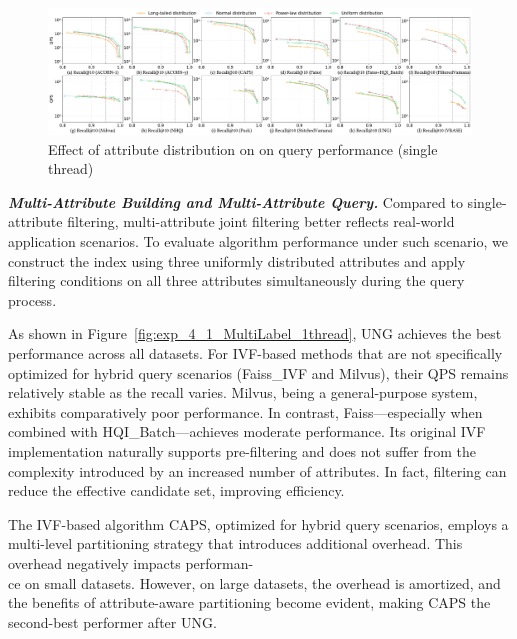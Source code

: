 \documentclass[sigconf, nonacm]{acmart}
\begin{document}
\begin{sloppypar}
\begin{figure}
        \centering
        \setlength{\abovecaptionskip}{0cm}
        \setlength{\belowcaptionskip}{-0.4cm}
        \includegraphics[width=\textwidth]{figures/exp/exp_3_1.pdf}
        \caption{Effect of attribute distribution on on query performance (single thread)}
        \label{fig:exp_3_1}
\end{figure}





\textit{\textbf{Multi-Attribute Building and Multi-Attribute Query.}}  
Compared to single-attribute filtering, multi-attribute joint filtering better reflects real-world application scenarios. To evaluate algorithm performance under such scenario, we construct the index using three uniformly distributed attributes and apply filtering conditions on all three attributes simultaneously during the query process.

As shown in Figure~\ref{fig:exp_4_1_MultiLabel_1thread}, UNG achieves the best performance across all datasets. For IVF-based methods that are not specifically optimized for hybrid query scenarios (Faiss\_IVF and Milvus), their QPS remains relatively stable as the recall varies. Milvus, being a general-purpose system, exhibits comparatively poor performance. In contrast, Faiss—especially when combined with HQI\_Batch—achieves moderate performance. Its original IVF implementation naturally supports pre-filtering and does not suffer from the complexity introduced by an increased number of attributes. In fact, filtering can reduce the effective candidate set, improving efficiency.

The IVF-based algorithm CAPS, optimized for hybrid query scenarios, employs a multi-level partitioning strategy that introduces additional overhead. This overhead negatively impacts performan-\\ce on small datasets. However, on large datasets, the overhead is amortized, and the benefits of attribute-aware partitioning become evident, making CAPS the second-best performer after UNG.


\end{sloppypar}
\end{document}
